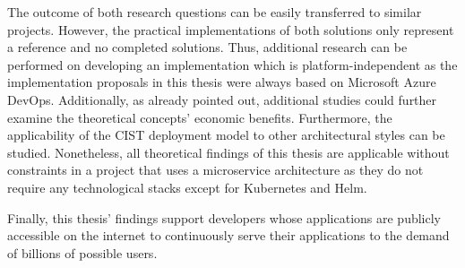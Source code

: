 The outcome of both research questions can be easily transferred to similar
projects. However, the practical implementations of both solutions only
represent a reference and no completed solutions. Thus, additional research can
be performed on developing an implementation which is platform-independent as
the implementation proposals in this thesis were always based on Microsoft
Azure DevOps. Additionally, as already pointed out, additional studies could
further examine the theoretical concepts' economic benefits. Furthermore, the
applicability of the \ac{CIST} deployment model to other architectural styles
can be studied. Nonetheless, all theoretical findings of this thesis are
applicable without constraints in a project that uses a microservice
architecture as they do not require any technological stacks except for
Kubernetes and Helm.

Finally, this thesis' findings support developers whose applications are
publicly accessible on the internet to continuously serve their applications to
the demand of billions of possible users.
